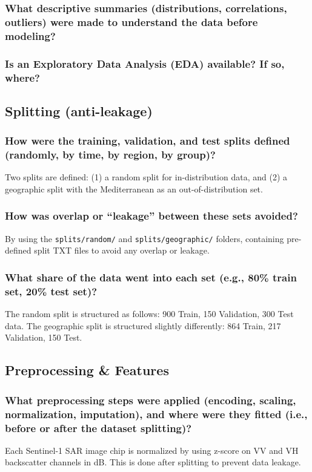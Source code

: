 \documentclass[sigconf]{acmart}
\begin{document}
\subsubsection{What descriptive summaries (distributions, correlations, outliers) were made to understand the data before modeling?}
\subsubsection{Is an Exploratory Data Analysis (EDA) available? If so, where?}

\subsection{Splitting (anti-leakage)}
\subsubsection{How were the training, validation, and test splits defined (randomly, by time, by region, by group)?} Two splits are defined: (1) a random split for in-distribution data, and (2) a geographic split with the Mediterranean as an out-of-distribution set.
\subsubsection{How was overlap or ``leakage'' between these sets avoided?} By using the \texttt{splits/random/} and \texttt{splits/geographic/} folders, containing pre-defined split TXT files to avoid any overlap or leakage.
\subsubsection{What share of the data went into each set (e.g., 80\% train set, 20\% test set)?} The random split is structured as follows: 900 Train, 150 Validation, 300 Test data. The geographic split is structured slightly differently: 864 Train, 217 Validation, 150 Test.
\subsection{Preprocessing \& Features}
\subsubsection{What preprocessing steps were applied (encoding, scaling, normalization, imputation), and where were they fitted (i.e., before or after the dataset splitting)?} Each Sentinel-1 SAR image chip is normalized by using z-score on VV and VH backscatter channels in dB. This is done after splitting to prevent data leakage.
\end{document}
